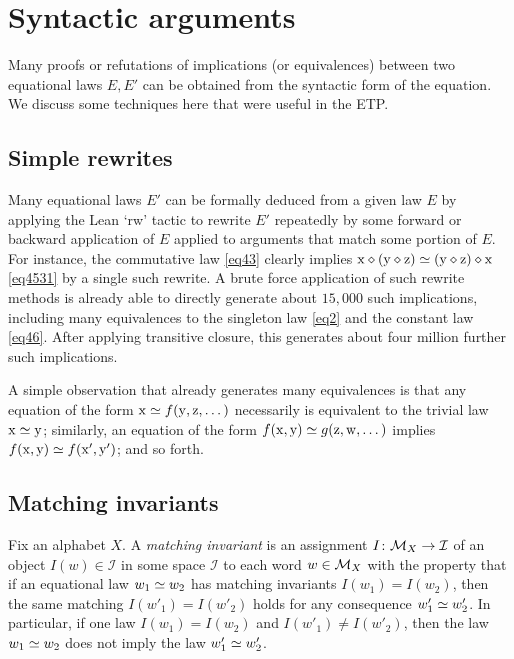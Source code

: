 
\section{Syntactic arguments}\label{syntactic-sec}

Many proofs or refutations of implications (or equivalences) between two equational laws $E,E'$ can be obtained from the syntactic form of the equation.  We discuss some techniques here that were useful in the ETP.

\subsection{Simple rewrites}\label{rewrite-sec}

Many equational laws $E'$ can be formally deduced from a given law $E$ by applying the Lean `rw' tactic to rewrite $E'$ repeatedly by some forward or backward application of $E$ applied to arguments that match some portion of $E$.  For instance, the commutative law \eqref{eq43} clearly implies $\mathrm{x} \diamond (\mathrm{y} \diamond \mathrm{z}) \simeq (\mathrm{y} \diamond \mathrm{z}) \diamond \mathrm{x}$ \eqref{eq4531}
by a single such rewrite.  A brute force application of such rewrite methods is already able to directly generate about $15,000$ such implications, including many equivalences to the singleton law \eqref{eq2} and the constant law \eqref{eq46}.  After applying transitive closure, this generates about four million further such implications.

A simple observation that already generates many equivalences is that any equation of the form $\mathrm{x} \simeq f(\mathrm{y},\mathrm{z},\dots)$ necessarily is equivalent to the trivial law $\mathrm{x} \simeq \mathrm{y}$; similarly, an equation of the form $f(\mathrm{x},\mathrm{y}) \simeq g(\mathrm{z},\mathrm{w},\dots)$ implies $f(\mathrm{x},\mathrm{y}) \simeq f(\mathrm{x}',\mathrm{y}')$; and so forth. 

\subsection{Matching invariants}

Fix an alphabet $X$. A \emph{matching invariant} is an assignment $I \colon {\mathcal{M}}_X \to {\mathcal I}$ of an object $I(w) \in {\mathcal I}$ in some space ${\mathcal I}$ to each word $w \in {\mathcal{M}}_X$ with the property that if an equational law $w_1 \simeq w_2$ has matching invariants $I(w_1)=I(w_2)$, then the same matching $I(w'_1) = I(w'_2)$ holds for any consequence $w'_1 \simeq w'_2$.  In particular, if one law $I(w_1)=I(w_2)$ and $I(w'_1) \neq I(w'_2)$, then the law $w_1 \simeq w_2$ does not imply the law $w'_1 \simeq w'_2$.

